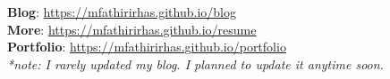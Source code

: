\begin{cvparagraph}


    \textbf{Blog}: \href{https://mfathirirhas.github.io/blog}{https://mfathirirhas.github.io/blog} 
    \\
    \textbf{More}: \href{https://mfathirirhas.github.io/resume}{https://mfathirirhas.github.io/resume}
    \\
    \textbf{Portfolio}: \href{https://mfathirirhas.github.io/portfolio}{https://mfathirirhas.github.io/portfolio}
    \\
    \emph{*note: I rarely updated my blog. I planned to update it anytime soon.}
    \\
\end{cvparagraph}